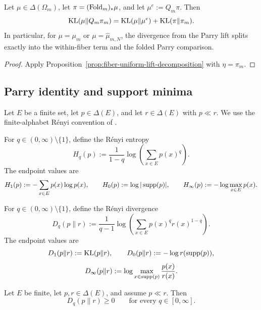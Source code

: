 \begin{corollary}\label{cor:tv-decomposition-parry}
Let \(\mu\in\Delta(\Omega_m)\), let \(\pi=(\mathrm{Fold}_m)_*\mu\), and let
\(\mu^e:=Q_m\pi\). Then
\[
\operatorname{KL}(\mu\|Q_m\pi_m)
=
\operatorname{KL}(\mu\|\mu^e)+\operatorname{KL}(\pi\|\pi_m).
\]
In particular, for \(\mu=\mu_m\) or \(\mu=\hat\mu_{m,N}\), the divergence from
the Parry lift splits exactly into the within-fiber term and the folded Parry
comparison.
\end{corollary}

\begin{proof}
Apply Proposition~\ref{prop:fiber-uniform-lift-decomposition} with
\(\eta=\pi_m\).
\end{proof}

\subsection{Parry identity and support minima}

\begin{definition}\label{def:renyi-entropy-divergence}
Let \(E\) be a finite set, let \(p\in\Delta(E)\), and let \(r\in\Delta(E)\)
with \(p\ll r\).  We use the finite-alphabet R\'enyi convention of
\cite{Renyi1961EntropyInformation,CoverThomas2006,SasonVerdu2016fDivergence}.

For \(q\in(0,\infty)\setminus\{1\}\), define the R\'enyi entropy
\[
H_q(p):=\frac{1}{1-q}\log\!\left(\sum_{x\in E}p(x)^q\right).
\]
The endpoint values are
\[
H_1(p):=-\sum_{x\in E}p(x)\log p(x),\qquad
H_0(p):=\log|\operatorname{supp}(p)|,\qquad
H_\infty(p):=-\log\max_{x\in E}p(x).
\]

For \(q\in(0,\infty)\setminus\{1\}\), define the R\'enyi divergence
\[
D_q(p\|r):=\frac{1}{q-1}\log\!\left(\sum_{x\in E}p(x)^q r(x)^{1-q}\right).
\]
The endpoint values are
\[
D_1(p\|r):=\operatorname{KL}(p\|r),\qquad
D_0(p\|r):=-\log r(\operatorname{supp}(p)),
\]
\[
D_\infty(p\|r):=
\log\max_{x\in\operatorname{supp}(p)}\frac{p(x)}{r(x)}.
\]
\end{definition}

\begin{lemma}\label{lem:renyi-nonnegativity}
Let \(E\) be finite, let \(p,r\in\Delta(E)\), and assume \(p\ll r\).  Then
\[
D_q(p\|r)\ge0\qquad\text{for every }q\in[0,\infty].
\]
\end{lemma}

